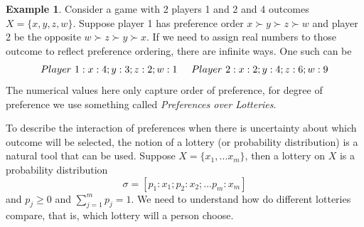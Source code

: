 \documentclass{article}
\theoremstyle{definition}
\newtheorem{example}{Example}[section]
\begin{document}
\begin{example} 
Consider a game with 2 players 1 and 2 and 4 outcomes $X = \{x,y,z,w\}$. Suppose player 1 has preference order $x\succ y\succ z\succ w$ and player 2 be the opposite $w\succ z\succ y\succ x$. If we need to assign real numbers to those outcome to reflect preference ordering, there are infinite ways. One such can be $$Player~1: x:4;y:3;z:2;w:1 \hspace{5mm} Player~2: x:2;y:4;z:6;w:9$$
The numerical values here only capture order of preference, for degree of preference we use something called \textit{Preferences over Lotteries}.
\end{example}

To describe the interaction of preferences when there is uncertainty about which outcome will be selected, the notion of a lottery (or probability distribution) is a natural tool that can be used. Suppose $X= \{x_1,\dots x_m\}$, then a lottery on $X$ is a probability distribution $$\sigma = [p_1:x_1; p_2:x_2;\dots p_m:x_m]$$ and $p_j\geq 0$ and $\sum_{j=1}^m p_j = 1$. We need to understand how do different lotteries compare, that is, which lottery will a person choose.
\end{document}
